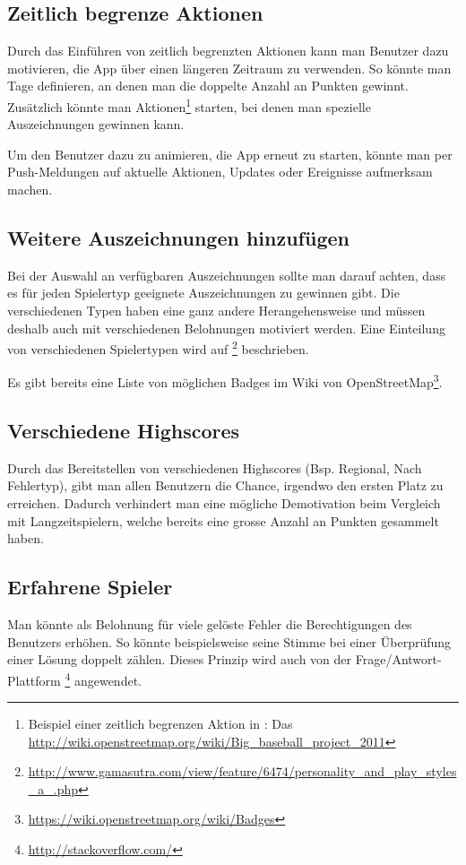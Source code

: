 \subsection{Zeitlich begrenze Aktionen}
Durch das Einführen von zeitlich begrenzten Aktionen kann man Benutzer dazu motivieren, die App über einen längeren Zeitraum zu verwenden.
So könnte man Tage definieren, an denen man die doppelte Anzahl an Punkten gewinnt.
Zusätzlich könnte man Aktionen\footnote{Beispiel einer zeitlich begrenzen Aktion in : Das  \url{http://wiki.openstreetmap.org/wiki/Big_baseball_project_2011}} starten, bei denen man spezielle Auszeichnungen gewinnen kann.

Um den Benutzer dazu zu animieren, die App erneut zu starten, könnte man per Push-Meldungen auf aktuelle Aktionen, Updates oder Ereignisse aufmerksam machen.

\subsection{Weitere Auszeichnungen hinzufügen}
Bei der Auswahl an verfügbaren Auszeichnungen sollte man darauf achten, dass es für jeden Spielertyp geeignete Auszeichnungen zu gewinnen gibt.
Die verschiedenen Typen haben eine ganz andere Herangehensweise und müssen deshalb auch mit verschiedenen Belohnungen motiviert werden.
Eine Einteilung von verschiedenen Spielertypen wird auf \footnote{\url{http://www.gamasutra.com/view/feature/6474/personality_and_play_styles_a_.php}} beschrieben.

Es gibt bereits eine Liste von möglichen Badges im Wiki von OpenStreetMap\footnote{\url{https://wiki.openstreetmap.org/wiki/Badges}}.

\subsection{Verschiedene Highscores}
Durch das Bereitstellen von verschiedenen Highscores (Bsp. Regional, Nach Fehlertyp), gibt man allen Benutzern die Chance, irgendwo den ersten Platz zu erreichen.
Dadurch verhindert man eine mögliche Demotivation beim Vergleich mit Langzeitspielern, welche bereits eine grosse Anzahl an Punkten gesammelt haben.

\subsection{Erfahrene Spieler}
Man könnte als Belohnung für viele gelöste Fehler die Berechtigungen des Benutzers erhöhen.
So könnte beispielsweise seine Stimme bei einer Überprüfung einer Lösung doppelt zählen.
Dieses Prinzip wird auch von der Frage/Antwort-Plattform \footnote{\url{http://stackoverflow.com/}} angewendet.

